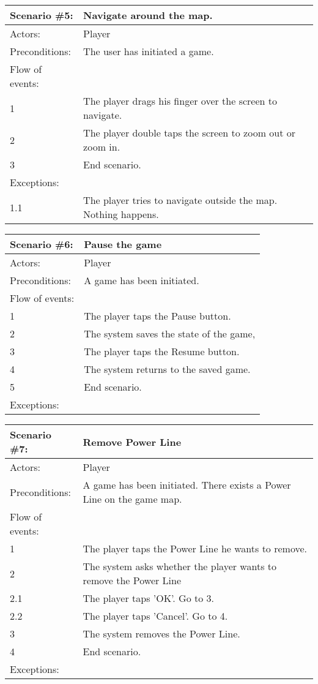\begin{tabular}{| l | p{10cm} |}
	\hline
	{\bf Scenario \#5:} & {\bf Navigate around the map.} \\ \hline
	Actors: & Player \\ \hline
	Preconditions: & The user has initiated a game. \\ \hline
	Flow of events: & \\ \hline
	1 & The player drags his finger over the screen to navigate. \\ \hline
	2 & The player double taps the screen to zoom out or zoom in. \\ \hline
	3 & End scenario. \\ \hline
	Exceptions: & \\ \hline
	1.1 & The player tries to navigate outside the map. Nothing happens. \\ \hline
\end{tabular}

\begin{tabular}{| l | p{10cm} |}
	\hline
	{\bf Scenario \#6:} & {\bf Pause the game} \\ \hline
	Actors: & Player \\ \hline
	Preconditions: & A game has been initiated. \\ \hline
	Flow of events: & \\ \hline
	1 & The player taps the Pause button. \\ \hline
	2 & The system saves the state of the game, \\ \hline
	3 & The player taps the Resume button. \\ \hline
	4 & The system returns to the saved game. \\ \hline
	5 & End scenario. \\ \hline
	Exceptions: & \\ \hline
\end{tabular}

\begin{tabular}{| l | p{10cm} |}
	\hline
	{\bf Scenario \#7:} & {\bf Remove Power Line} \\ \hline
	Actors: & Player \\ \hline
	Preconditions: & A game has been initiated. There exists a Power Line on the game map. \\ \hline
	Flow of events: & \\ \hline
	1 & The player taps the Power Line he wants to remove. \\ \hline
	2 & The system asks whether the player wants to remove the Power Line \\ \hline
	2.1 & The player taps 'OK'. Go to 3. \\ \hline
	2.2 & The player taps 'Cancel'. Go to 4. \\ \hline
	3 & The system removes the Power Line. \\ \hline
	4 & End scenario. \\ \hline
	Exceptions: & \\ \hline
\end{tabular}

